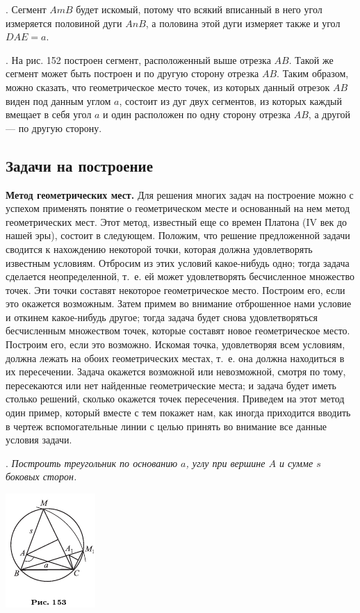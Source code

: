 \documentclass[oneside]{book}
\begin{document}
.
Сегмент $AmB$ будет искомый, потому что всякий вписанный в него угол измеряется половиной дуги $AnB$, а половина этой дуги измеряет также и угол $DAE=a$.

.
На рис. 152 построен сегмент, расположенный выше отрезка $AB$.
Такой же сегмент может быть построен и по другую сторону отрезка $AB$.
Таким образом, можно сказать, что геометрическое место точек, из которых данный отрезок $AB$ виден под данным углом $a$, состоит из дуг двух сегментов, из которых каждый вмещает в себя угол $a$ и один расположен по одну сторону отрезка $AB$, а другой — по другую сторону.

\subsection*{Задачи на построение}

\textbf{Метод геометрических мест.}
Для решения многих задач на построение можно с успехом применять понятие о геометрическом месте и основанный на нем метод геометрических мест.
Этот метод, известный еще со времен Платона (IV век до нашей эры), состоит в следующем.
Положим, что решение предложенной задачи сводится к нахождению некоторой точки, которая должна удовлетворять известным условиям.
Отбросим из этих условий какое-нибудь одно;
тогда задача сделается неопределенной, т.~е. ей может удовлетворять бесчисленное множество точек.
Эти точки составят некоторое геометрическое место.
Построим его, если это окажется возможным.
Затем примем во внимание отброшенное нами условие и откинем какое-нибудь другое;
тогда задача будет снова удовлетворяться бесчисленным множеством точек, которые составят новое геометрическое место.
Построим его, если это возможно.
Искомая точка, удовлетворяя всем условиям, должна лежать на обоих геометрических местах, т.~е. она должна находиться в их пересечении.
Задача окажется возможной или невозможной, смотря по тому, пересекаются или нет найденные геометрические места;
и задача будет иметь столько решений, сколько окажется точек пересечения.
Приведем на этот метод один пример, который вместе с тем покажет нам, как иногда приходится вводить в чертеж вспомогательные линии с целью принять во внимание все данные условия задачи.

.
\emph{Построить треугольник по основанию $a$, углу при вершине $A$ и сумме $s$ боковых сторон.}

\includegraphics{pics/ris-153}
\end{document}
